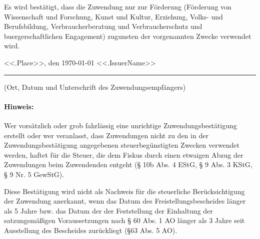 \documentclass[11pt,ngerman]{scrartcl}
\begin{document}
\begin{mdframed}[style=MyFormStyle]%
Es wird bestätigt, dass die Zuwendung nur zur Förderung (Förderung von Wissenschaft und Forschung, Kunst und Kultur, Erziehung, Volks- und Berufsbildung, Verbraucherberatung und Verbraucherschutz und buergerschaftlichen Engagement) zugunsten der vorgenannten Zwecke verwendet wird. 
\end{mdframed} 


\vspace*{2.5em} 

<<.Place>>, den \today \hspace*{20em} <<.IssuerName>>

\hrule

\vspace*{0.5em} (Ort, Datum und Unterschrift des Zuwendungsempfängers) 

\paragraph{Hinweis:} Wer vorsätzlich oder grob fahrlässig eine unrichtige Zuwendungsbestätigung erstellt oder wer veranlasst, dass 
Zuwendungen nicht zu den in der Zuwendungsbestätigung angegebenen steuerbegünstigten Zwecken verwendet 
werden, haftet für die Steuer, die dem Fiskus durch einen etwaigen Abzug der Zuwendungen beim Zuwendenden entgeht (§ 10b Abs. 4 EStG, § 9 Abs. 3 KStG, § 9 Nr. 5 GewStG). 

Diese Bestätigung wird nicht als Nachweis für die steuerliche Berücksichtigung der Zuwendung anerkannt, wenn das Datum des Freistellungsbescheides länger als 5 Jahre bzw. das Datum der der Feststellung der Einhaltung der satzungsmäßigen Voraussetzungen nach § 60 Abs. 1 AO länger als 3 Jahre seit Ausstellung des Bescheides zurückliegt (§63 Abs. 5 AO). 

\end{document}
